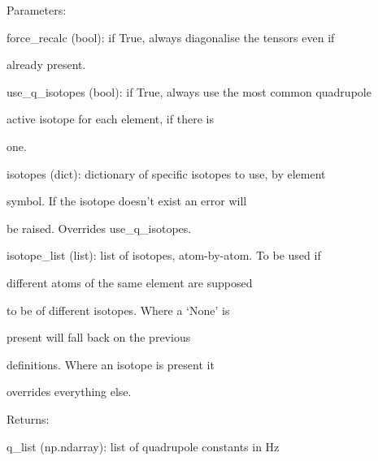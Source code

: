 \documentclass[letterpaper,10pt,english]{sphinxmanual}
\begin{document}
\begin{fulllineitems}
\begin{DUlineblock}{0em}
\item[] Parameters:
\item[]
\begin{DUlineblock}{\DUlineblockindent}
\item[] force\_recalc (bool): if True, always diagonalise the tensors even if
\item[]
\begin{DUlineblock}{\DUlineblockindent}
\item[] already present.
\end{DUlineblock}
\item[] use\_q\_isotopes (bool): if True, always use the most common quadrupole
\item[]
\begin{DUlineblock}{\DUlineblockindent}
\item[] active isotope for each element, if there is
\item[] one.
\end{DUlineblock}
\item[] isotopes (dict): dictionary of specific isotopes to use, by element
\item[]
\begin{DUlineblock}{\DUlineblockindent}
\item[] symbol. If the isotope doesn't exist an error will
\item[] be raised. Overrides use\_q\_isotopes.
\end{DUlineblock}
\item[] isotope\_list (list): list of isotopes, atom-by-atom. To be used if 
\item[]
\begin{DUlineblock}{\DUlineblockindent}
\item[] different atoms of the same element are supposed
\item[] to be of different isotopes. Where a `None' is 
\item[] present will fall back on the previous
\item[] definitions. Where an isotope is present it
\item[] overrides everything else. 
\end{DUlineblock}
\end{DUlineblock}
\end{DUlineblock}

\begin{DUlineblock}{0em}
\item[] Returns:
\item[]
\begin{DUlineblock}{\DUlineblockindent}
\item[] q\_list (np.ndarray): list of quadrupole constants in Hz
\end{DUlineblock}
\end{DUlineblock}


\end{fulllineitems}
\end{document}
